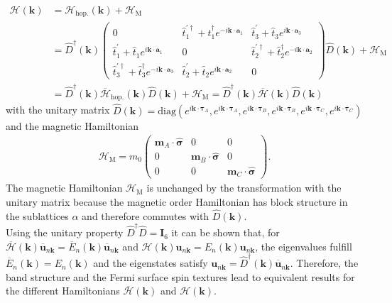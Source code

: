 \begin{align}
        \mathcal{H}(\mathbf{k})&=\mathcal{H}_\text{hop.}(\mathbf{k}) +  \mathcal{H}_\text{M} \nonumber\\
        &=  \hat{D}^\dagger(\mathbf{k})\begin{pmatrix}
        0 
        & \hat{t}_1^{\prime\dagger} + \hat{t}_1^{\dagger} e^{- i \mathbf{k} \cdot \mathbf{a}_1} 
        & \hat{t}_3^{\prime} + \hat{t}_3 e^{i \mathbf{k} \cdot \mathbf{a}_3} \\[4pt]
        \hat{t}_1^{\prime} + \hat{t}_1 e^{i \mathbf{k} \cdot \mathbf{a}_1} 
        & 0 
        & \hat{t}_2^{\prime\dagger} + \hat{t}_2^{\dagger} e^{- i \mathbf{k} \cdot \mathbf{a}_2} \\[4pt]
        \hat{t}_3^{\prime\dagger} + \hat{t}_3^{\dagger} e^{- i \mathbf{k} \cdot \mathbf{a}_3} 
        & \hat{t}_2^{\prime} + \hat{t}_2 e^{i \mathbf{k} \cdot \mathbf{a}_2} 
        & 0
    \end{pmatrix}\hat{D}(\mathbf{k}) + \mathcal{H}_\text{M} \nonumber\\ 
    &=  \hat{D}^\dagger(\mathbf{k}) \overline{\mathcal{H}}_\text{hop.}(\mathbf{k}) \hat{D}(\mathbf{k})+ \mathcal{H}_\text{M} = \hat{D}^\dagger(\mathbf{k}) \overline{\mathcal{H}}(\mathbf{k}) \hat{D}(\mathbf{k})
    \label{eq: bloch-Hamiltonian}
\end{align}
with the unitary matrix $\hat{D}(\mathbf{k}) = \text{diag}\left(e^{i\mathbf{k}\cdot\bm{\tau}_A}, e^{i\mathbf{k}\cdot\bm{\tau}_A}, e^{i\mathbf{k}\cdot\bm{\tau}_B}, e^{i\mathbf{k}\cdot\bm{\tau}_B}, e^{i\mathbf{k}\cdot\bm{\tau}_C}, e^{i\mathbf{k}\cdot\bm{\tau}_C}\right)$ and the magnetic Hamiltonian 
\begin{align}
    \mathcal{H}_\text{M} =  m_0\begin{pmatrix}
        \mathbf{m}_A\cdot\bm{\hat{\sigma}} & 0 &0\\
        0 &  \mathbf{m}_B\cdot\bm{\hat{\sigma}} & 0\\
        0 & 0 &  \mathbf{m}_C\cdot\bm{\hat{\sigma}}
    \end{pmatrix}.
\end{align}
The magnetic Hamiltonian $\mathcal{H}_\text{M}$ is unchanged by the transformation with the unitary matrix because the magnetic order Hamiltonian has block structure in the sublattices $\alpha$ and therefore commutes with $\hat{D}(\mathbf{k})$. \\
Using the unitary property $\hat{D}^\dagger \hat{D} = \mathbf{I}_6$ it can be shown that, for $\overline{\mathcal{H}}(\mathbf{k})\overline{\mathbf{u}}_{n\mathbf{k}} = \overline{E}_n(\mathbf{k})\overline{\mathbf{u}}_{n\mathbf{k}}$ and $\mathcal{H}(\mathbf{k})\mathbf{u}_{n\mathbf{k}} = E_n(\mathbf{k})\mathbf{u}_{n\mathbf{k}}$, the eigenvalues fulfill $\overline{E}_n(\mathbf{k}) = E_n(\mathbf{k})$ and the eigenstates satisfy $\mathbf{u}_{n\mathbf{k}}=\hat{D}^\dagger(\mathbf{k})\overline{\mathbf{u}}_{n\mathbf{k}}$. Therefore, the band structure and the Fermi surface spin textures lead to equivalent results for the different Hamiltonians $\overline{\mathcal{H}}(\mathbf{k})$ and $\mathcal{H}(\mathbf{k})$.\\
